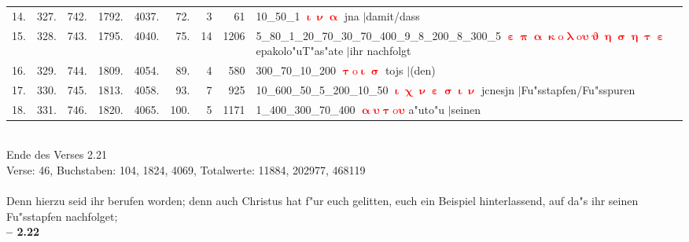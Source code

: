 \documentclass[a4paper,10pt,landscape]{article}
\begin{document}
\begin{tabular}{rrrrrrrrp{120mm}}
14.&327.&742.&1792.&4037.&72.&3&61&10\_50\_1 \textcolor{red}{$\boldsymbol{\upiota\upnu\upalpha}$} jna $|$damit/dass\\
15.&328.&743.&1795.&4040.&75.&14&1206&5\_80\_1\_20\_70\_30\_70\_400\_9\_8\_200\_8\_300\_5 \textcolor{red}{$\boldsymbol{\upepsilon\uppi\upalpha\upkappa\mathrm{o}\uplambda\mathrm{o}\upsilon\upvartheta\upeta\upsigma\upeta\uptau\upepsilon}$} epakolo"uT"as"ate $|$ihr nachfolgt\\
16.&329.&744.&1809.&4054.&89.&4&580&300\_70\_10\_200 \textcolor{red}{$\boldsymbol{\uptau\mathrm{o}\upiota\upsigma}$} tojs $|$(den)\\
17.&330.&745.&1813.&4058.&93.&7&925&10\_600\_50\_5\_200\_10\_50 \textcolor{red}{$\boldsymbol{\upiota\upchi\upnu\upepsilon\upsigma\upiota\upnu}$} jcnesjn $|$Fu"sstapfen/Fu"sspuren\\
18.&331.&746.&1820.&4065.&100.&5&1171&1\_400\_300\_70\_400 \textcolor{red}{$\boldsymbol{\upalpha\upsilon\uptau\mathrm{o}\upsilon}$} a"uto"u $|$seinen\\
\end{tabular}\medskip \\
Ende des Verses 2.21\\
Verse: 46, Buchstaben: 104, 1824, 4069, Totalwerte: 11884, 202977, 468119\\
\\
Denn hierzu seid ihr berufen worden; denn auch Christus hat f"ur euch gelitten, euch ein Beispiel hinterlassend, auf da"s ihr seinen Fu"sstapfen nachfolget;\\
\newpage 
{\bf -- 2.22}\\
\medskip \\
\end{document}
